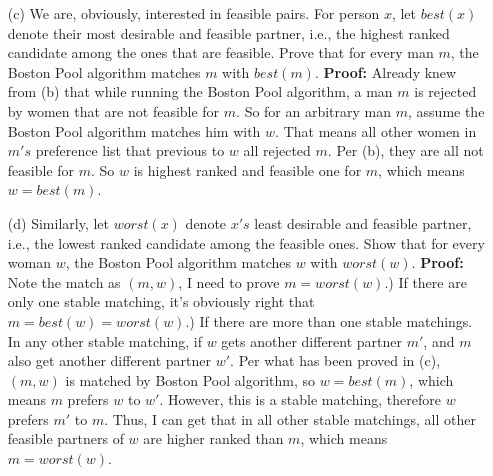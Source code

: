 \documentclass{article}       %
\begin{document}
\begin{enumerate}
\begin{enumerate}
                \item[(c)] We are, obviously, interested in feasible pairs. For person $x$, let $best(x)$ denote their most desirable and feasible partner, i.e., the highest ranked candidate among the ones that are feasible. Prove that for every man $m$, the Boston Pool algorithm matches $m$ with $best(m)$.\newline\newline
                \textbf{Proof:} Already knew from (b) that while running the Boston Pool algorithm, a man $m$ is rejected by women that are not feasible for $m$. So for an arbitrary man $m$, assume the Boston Pool algorithm matches him with $w$. That means all other women in $m's$ preference list that previous to $w$ all rejected $m$. Per (b), they are all not feasible for $m$. So $w$ is highest ranked and feasible one for $m$, which means $w = best(m)$.\newline
                
                
                \item[(d)] Similarly, let $worst(x)$ denote $x's$ least desirable and feasible partner, i.e., the lowest ranked candidate among the feasible ones. Show that for every woman $w$, the Boston Pool algorithm matches $w$ with $worst(w)$.\newline\newline
                \textbf{Proof:} Note the match as $(m, w)$, I need to prove $m = worst(w)$.) If there are only one stable matching, it's obviously right that $m = best(w) = worst(w)$.) If there are more than one stable matchings. In any other stable matching, if $w$ gets another different partner $m'$, and $m$ also get another different partner $w'$. Per what has been proved in (c), $(m, w)$ is matched by Boston Pool algorithm, so $w = best(m)$, which means $m$ prefers $w$ to $w'$. However, this is a stable matching, therefore $w$ prefers $m'$ to $m$. Thus, I can get that in all other stable matchings, all other feasible partners of $w$ are higher ranked than $m$, which means $m = worst(w)$.\newline
                

\end{enumerate}
\end{enumerate}
\end{document}
